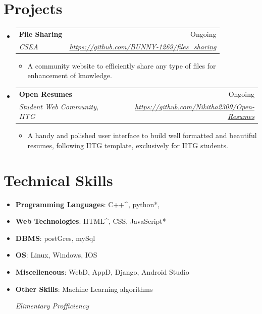 \documentclass[a4paper,10pt]{report}
\makeatletter
\newcommand{\resumeItem}[2]{
  \item\small{
    \textbf{#1}{: #2 \vspace{-2pt}}
  }
}
\newcommand{\resumeSubheading}[4]{
  \vspace{-1pt}\item
    \begin{tabular*}{0.97\textwidth}[t]{l@{\extracolsep{\fill}}r}
      \textbf{#1} & #2 \\
      \textit{\small#3} & \textit{\small #4} \\
    \end{tabular*}\vspace{-6pt}
}
\newcommand{\resumeSubItem}[2]{\resumeItem{#1}{#2}\vspace{-4pt}}
\newcommand{\resumeSubHeadingListStart}{\begin{itemize}[leftmargin=*]}
\newcommand{\resumeSubHeadingListEnd}{\end{itemize}}
\makeatother
\begin{document}
\vspace{4pt}


\section{Projects}
\resumeSubHeadingListStart

\resumeSubheading{File Sharing}{Ongoing}{CSEA}{\href{https://github.com/BUNNY-1269/files_sharing}{\textit{\small https://github.com/BUNNY-1269/files_sharing   }}}
\begin{itemize}
\item A community website to efficiently share any type of files for enhancement of knowledge.
 \end{itemize}
\vspace{2pt}

\resumeSubheading{Open Resumes}{Ongoing}{Student Web Community, IITG}{\href{https://github.com/Nikitha2309/Open-Resumes}{\textit{\small https://github.com/Nikitha2309/Open-Resumes   }}}
\begin{itemize}
\item A handy and polished user interface to build well formatted and beautiful resumes, following IITG template, exclusively for IITG students.
 \end{itemize}
\vspace{2pt}

  
\resumeSubHeadingListEnd


\vspace{4pt}


\section{Technical Skills}

 \resumeSubHeadingListStart
 
\resumeSubItem{Programming Languages}{C++^, python*, }
\resumeSubItem{Web Technologies}{HTML^, CSS, JavaScript*}
\resumeSubItem{DBMS}{postGres, mySql}
\resumeSubItem{OS}{Linux, Windows, IOS}
\resumeSubItem{Miscelleneous}{WebD, AppD, Django, Android Studio}
\resumeSubItem{Other Skills}{Machine Learning algorithms}
 
 \hfill * \textit{Elimentary Profficiency}
 
 \resumeSubHeadingListEnd
 
\end{document}

